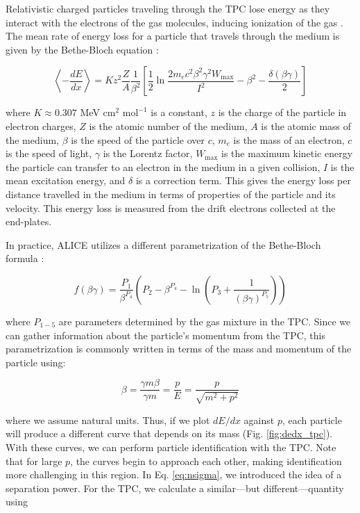\documentclass[../main.tex]{subfiles}
\begin{document}
Relativistic charged particles traveling through the TPC lose energy as they interact with the electrons of the gas molecules, inducing ionization of the gas \cite{Thomson:particle}. The mean rate of energy loss for a particle that travels through the medium is given by the Bethe-Bloch equation \cite{Bichsel:2004ej}:

\begin{equation}
    \left\langle -\frac{dE}{dx} \right\rangle = Kz^2\frac{Z}{A}\frac{1}{\beta^2}\left[\frac{1}{2}\ln\frac{2m_ec^2\beta^2\gamma^2W_{\text{max}}}{I^2}-\beta^2-\frac{\delta(\beta\gamma)}{2}\right]
\end{equation}

where $K \approx 0.307$ MeV $\text{cm}^2$ $\text{mol}^{-1}$ is a constant, $z$ is the charge of the particle in electron charges, $Z$ is the atomic number of the medium, $A$ is the atomic mass of the medium, $\beta$ is the speed of the particle over $c$, $m_e$ is the mass of an electron, $c$ is the speed of light, $\gamma$ is the Lorentz factor, $W_{\text{max}}$ is the maximum kinetic energy the particle can transfer to an electron in the medium in a given collision, $I$ is the mean excitation energy, and $\delta$ is a correction term. This gives the energy loss per distance travelled in the medium in terms of properties of the particle and its velocity. This energy loss is measured from the drift electrons collected at the end-plates.

In practice, ALICE utilizes a different parametrization of the Bethe-Bloch formula \cite{Yu:2013dca}:

\begin{equation}
    \label{eq:dedx}
    f(\beta \gamma) = \frac{P_1}{\beta^{P_4}} \left(P_2 - \beta^{P_4} -\ln\left(P_3 + \frac{1}{(\beta\gamma)^{P_5}}\right)\right)
\end{equation}

where $P_{1-5}$ are parameters determined by the gas mixture in the TPC. Since we can gather information about the particle's momentum from the TPC, this parametrization is commonly written in terms of the mass and momentum of the particle using:

\begin{equation}
    \label{eq:beta}
    \beta = \frac{\gamma m \beta}{\gamma m} = \frac{p}{E} = \frac{p}{\sqrt{m^2 + p^2}}
\end{equation}

where we assume natural units. Thus, if we plot $dE/dx$ against $p$, each particle will produce a different curve that depends on its mass (Fig. \ref{fig:dedx_tpc}). With these curves, we can perform particle identification with the TPC. Note that for large $p$, the curves begin to approach each other, making identification more challenging in this region. In Eq. \ref{eq:nsigma}, we introduced the idea of a separation power. For the TPC, we calculate a similar---but different---quantity using
\end{document}
